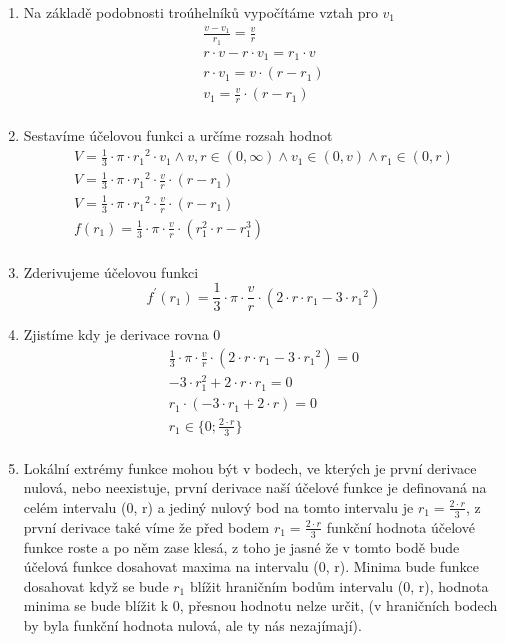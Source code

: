 \documentclass[a4paper, 11pt]{article}
\begin{document}
\begin{enumerate}
\item Na základě podobnosti troúhelníků vypočítáme vztah pro $v_1$
\begin{equation} 
\begin{gathered}
	\frac{v - v_1}{r_1} = \frac{v}{r} \\
	r \cdot v - r \cdot v_1 = r_1 \cdot v \\
	r \cdot v_1 = v \cdot (r - r_1)\\
	v_1 = \frac{v}{r}\cdot(r-r_1)\\
\end{gathered}
\end{equation}
\item Sestavíme účelovou funkci a určíme rozsah hodnot
\begin{equation} 
\begin{gathered}
V = \frac{1}{3} \cdot \pi \cdot {r_1}^2 \cdot v_1 \wedge v, r \in (0, \infty) \wedge v_1 \in (0, v) \wedge r_1 \in (0, r) \\
V = \frac{1}{3} \cdot \pi \cdot {r_1}^2 \cdot \frac{v}{r}\cdot(r-r_1) \\
V = \frac{1}{3} \cdot \pi \cdot {r_1}^2 \cdot \frac{v}{r}\cdot(r-r_1) \\
f(r_1) = \frac{1}{3} \cdot \pi \cdot \frac{v}{r}\cdot(r_1^2 \cdot r - r_1^3)\\
\end{gathered}
\end{equation}
\item Zderivujeme účelovou funkci
\begin{equation}f^\prime(r_1) = \frac{1}{3} \cdot \pi \cdot \frac{v}{r} \cdot (2 \cdot r \cdot r_1 - 3 \cdot {r_1}^2)\end{equation}
\item Zjistíme kdy je derivace rovna 0
\begin{equation} 
\begin{gathered}
\frac{1}{3} \cdot \pi \cdot \frac{v}{r} \cdot (2 \cdot r \cdot r_1 - 3 \cdot {r_1}^2) = 0\\
-3 \cdot r_1^2+2\cdot r \cdot r_1 = 0 \\
r_1 \cdot (-3\cdot r_1 + 2 \cdot r) = 0\\
r_1 \in \{0; \frac{2 \cdot r}{3}\}\\
\end{gathered}
\end{equation}
\item Lokální extrémy funkce mohou být v bodech, ve kterých je první derivace nulová, nebo neexistuje, první derivace naší účelové funkce je definovaná na celém intervalu (0, r) a jediný nulový bod na tomto intervalu je $r_1 = \frac{2\cdot r}{3}$, z první derivace také víme že před bodem $r_1 = \frac{2\cdot r}{3}$ funkční hodnota účelové funkce roste a po něm zase klesá, z toho je jasné že v tomto bodě bude účelová funkce dosahovat maxima na intervalu (0, r). Minima bude funkce dosahovat když se bude $r_1$ blížit hraničním bodům intervalu (0, r), hodnota minima se bude blížit k 0, přesnou hodnotu nelze určit, (v hraničních bodech by byla funkční hodnota nulová, ale ty nás nezajímají). 

\end{enumerate}
\end{document}
